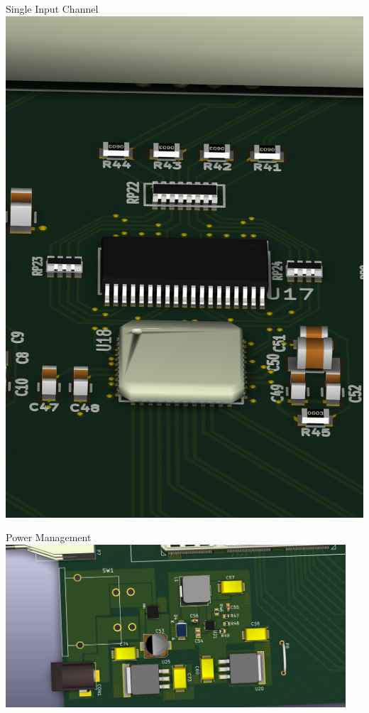 \documentclass{beamer}
\begin{document}
\begin{frame}{Single Input Channel}
  \centering
  \includegraphics[height=\textheight]{figures/DAQCard2015_Single_Channel}
\end{frame}

\begin{frame}{Power Management}
  \centering
  \includegraphics[width=0.95\textwidth]{figures/DAQCard2015_Power_small}
\end{frame}
\end{document}
